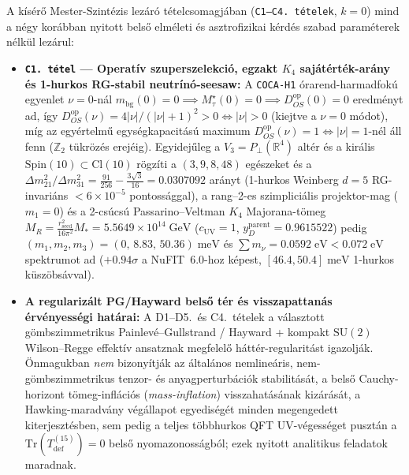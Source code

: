 \documentclass[11pt,a4paper]{article}
\theoremstyle{remark}
\begin{document}
A k\'is\'er\H{o} Mester-Szint\'ezis lez\'ar\'o t\'etelcsomagj\'aban (\texttt{C1--C4.\ t\'etelek}, $k = 0$) mind a n\'egy kor\'abban nyitott bels\H{o} elm\'eleti \'es asztrofizikai k\'erd\'es szabad param\'eterek n\'elk\"ul lez\'arul:
\begin{itemize}
  \item \textbf{\texttt{C1.\ t\'etel} --- Operat\'iv szuperszelekci\'o, egzakt $K_4$ saj\'at\'ert\'ek-ar\'any \'es 1-hurkos RG-stabil neutr\'in\'o-seesaw:} A \texttt{COCA-H1} \'orarend-harmadfok\'u egyenlet $\nu = 0$-n\'al $m_{\mathrm{bg}}(0) = 0 \implies M_\tau^\star(0) = 0 \implies D_{OS}^{\mathrm{op}}(0) = 0$ eredm\'enyt ad, \'igy $D_{OS}^{\mathrm{op}}(\nu) = 4|\nu|/(|\nu|+1)^2 > 0 \iff |\nu| > 0$ (kiejtve a $\nu = 0$ m\'odot), m\'ig az egy\'ertelm\H{u} egys\'egkapacit\'as\'u maximum $D_{OS}^{\mathrm{op}}(\nu) = 1 \iff |\nu| = 1$-n\'el \'all fenn ($\mathbb{Z}_2$ t\"ukr\"oz\'es erej\'eig). Egyidej\H{u}leg a $V_3 = P_\perp(\mathbb{R}^4)$ alt\'er \'es a kir\'alis $\mathrm{Spin}(10) \subset \mathrm{Cl}(10)$ r\"ogz\'iti a $(3, 9, 8, 48)$ eg\'eszeket \'es a $\Delta m_{21}^2/\Delta m_{31}^2 = \frac{91}{256} - \frac{3\sqrt{3}}{16} = 0.0307092$ ar\'anyt (1-hurkos Weinberg $d=5$ RG-invari\'ans $<6\times 10^{-5}$ pontoss\'aggal), a rang--2-es szimplici\'alis projektor-mag ($m_1 = 0$) \'es a 2-cs\'ucs\'u Passarino--Veltman $K_4$ Majorana-t\"omeg $M_R = \frac{r_{\mathrm{seed}}^2}{16\pi^2}M_* = 5.5649 \times 10^{14}\;\mathrm{GeV}$ ($c_{\mathrm{UV}} = 1$, $y_D^{\mathrm{parent}} = 0.9615522$) pedig $(m_1, m_2, m_3) = (0,\, 8.83,\, 50.36)\;\mathrm{meV}$ \'es $\sum m_\nu = 0.0592\;\mathrm{eV} < 0.072\;\mathrm{eV}$ spektrumot ad (\textbf{$+0.94\sigma$} a NuFIT~6.0-hoz k\'epest, $[46.4, 50.4]\;\mathrm{meV}$ 1-hurkos k\"usz\"obs\'avval).
  \item \textbf{A regulariz\'alt PG/Hayward bels\H{o} t\'er \'es visszapattan\'as \'erv\'enyess\'egi hat\'arai:} A D1--D5.\ \'es C4.\ t\'etelek a v\'alasztott g\"ombszimmetrikus Painlev\'e--Gullstrand / Hayward + kompakt $\mathrm{SU}(2)$ Wilson--Regge effekt\'iv ansatznak megfelel\H{o} h\'att\'er-regularit\'ast igazolj\'ak. \"Onmagukban \emph{nem} bizony\'itj\'ak az \'altal\'anos nemline\'aris, nem-g\"ombszimmetrikus tenzor- \'es anyagperturb\'aci\'ok stabilit\'as\'at, a bels\H{o} Cauchy-horizont t\"omeg-infl\'aci\'os (\emph{mass-inflation}) visszahat\'as\'anak kiz\'ar\'as\'at, a Hawking-maradv\'any v\'eg\'allapot egyedis\'eg\'et minden megengedett kiterjeszt\'esben, sem pedig a teljes t\"obbhurkos QFT UV-v\'egess\'eget puszt\'an a $\mathrm{Tr}(T_{\mathrm{def}}^{(15)}) = 0$ bels\H{o} nyomazonoss\'agb\'ol; ezek nyitott analitikus feladatok maradnak.

\end{itemize}
\end{document}

